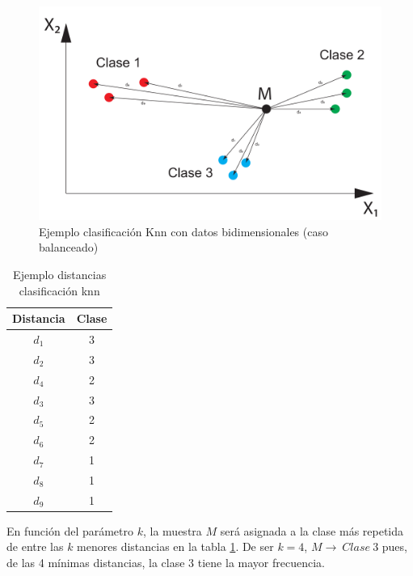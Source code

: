 \begin{figure}[H]
	\centering
	\captionsetup{justification=centering}
	\includegraphics[width=\textwidth]{imagenes/marco_teorico/knn/knn_ejemplo1.pdf}
	\caption{Ejemplo clasificación Knn con datos bidimensionales (caso balanceado)}
	\label{fig:knn_ejemplo1}
\end{figure}

\begin{table}[H]
	\centering
	\caption{Ejemplo distancias clasificación knn}
	\label{tab:knn_distancias}
	\begin{tabular}{|c|c|}
		\hline
		Distancia & Clase \\ \hline
		$d_{1}$        & 3     \\ \hline
		$d_{2}$        & 3     \\ \hline
		$d_{4}$        & 2     \\ \hline
		$d_{3}$        & 3     \\ \hline
		$d_{5}$        & 2     \\ \hline
		$d_{6}$        & 2     \\ \hline
		$d_{7}$        & 1     \\ \hline
		$d_{8}$        & 1     \\ \hline
		$d_{9}$        & 1     \\ \hline 
	\end{tabular}
\end{table}

En función del parámetro $k$, la muestra $M$ será asignada a la clase más repetida de entre las $k$ menores distancias en la tabla \ref{tab:knn_distancias}. De ser $k = 4$, $M \rightarrow\:Clase\:3 $ pues, de las 4 mínimas distancias, la clase 3 tiene la mayor frecuencia.


